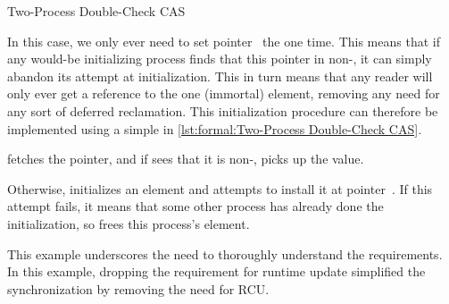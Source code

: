\begin{listing}
\caption{Two-Process Double-Check CAS}
\label{lst:formal:Two-Process Double-Check CAS}
\end{listing}

In this case, we only ever need to set pointer~ the one time.
This means that if any would-be initializing process finds that
this pointer in non-, it can simply abandon its attempt at
initialization.
This in turn means that any reader will only ever get a reference to
the one (immortal) element, removing any need for any sort of deferred
reclamation.
This initialization procedure can therefore be implemented using a simple
 in \cref{lst:formal:Two-Process Double-Check CAS}.

\begin{fcvref}
 fetches the pointer, and if  sees that it is
non-,  picks up the value.

Otherwise,  initializes an element and 
attempts to install it at pointer~.
If this attempt fails, it means that some other process has already done
the initialization, so  frees this process's element.
\end{fcvref}

\QuickQuizEnd

This example underscores the need to thoroughly understand the
requirements.
In this example, dropping the requirement for runtime update simplified
the synchronization by removing the need for RCU.

